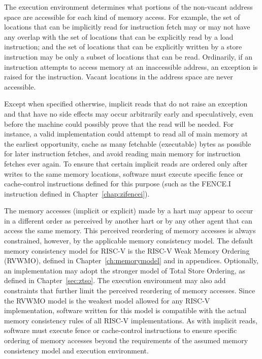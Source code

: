 The execution environment determines what portions of the
non-vacant address space are
accessible for each kind of memory access.  For example, the set of locations
that can be implicitly read for instruction fetch may or may not have any
overlap with the set of locations that can be explicitly read by a load
instruction; and the set of locations that can be explicitly written by
a store instruction may be only a subset of locations that can be read.
Ordinarily, if an instruction attempts to access memory at an inaccessible
address, an exception is raised for the instruction.
Vacant locations in the address space are never accessible.

Except when specified otherwise, implicit reads that do not raise an
exception and that have no side effects
may occur arbitrarily early and speculatively, even before the machine could
possibly prove that the read will be needed.  For instance, a valid
implementation could attempt to read all of main memory at the earliest
opportunity, cache as many fetchable (executable) bytes as possible for later
instruction fetches, and avoid reading main memory for instruction fetches ever
again.  To ensure that certain implicit reads are ordered only after writes to
the same memory locations, software must execute specific fence or cache-control
instructions defined for this purpose (such as the FENCE.I instruction
defined in Chapter~\ref{chap:zifencei}).

The memory accesses (implicit or explicit) made by a hart may appear to occur
in a different order as perceived by another hart or by any other agent that
can access the same memory.  This perceived reordering of memory accesses is
always constrained, however, by the applicable memory consistency model.  The
default memory consistency model for RISC-V is the RISC-V Weak Memory Ordering
(RVWMO), defined in Chapter~\ref{ch:memorymodel} and in appendices.
Optionally, an implementation may adopt the stronger model of Total Store
Ordering, as defined in Chapter~\ref{sec:ztso}.  The execution environment may
also add constraints that further limit the perceived reordering of memory
accesses.
Since the RVWMO model is the weakest model allowed for any RISC-V
implementation, software written for this model is compatible with the
actual memory consistency rules of all RISC-V implementations.  As with
implicit reads, software must execute fence or cache-control instructions to
ensure specific ordering of memory accesses beyond the requirements of the
assumed memory consistency model and execution environment.

